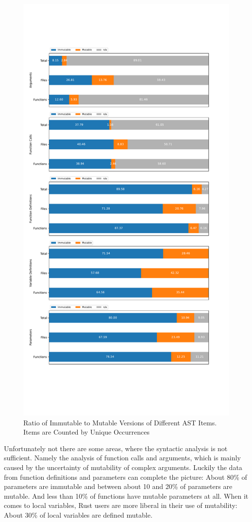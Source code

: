 \documentclass{book}
\theoremstyle{definition}
\begin{document}
\begin{figure}[h]
	\centering
	\includegraphics[width=0.9\linewidth, clip, trim={0.5cm 6cm 0.5cm 6cm}]{../mutability_by_category.pdf}
	\caption{Ratio of Immutable to Mutable Versions of Different AST Items. Items are Counted by Unique Occurrences}
	\label{fig:mutabillity_by_category}
\end{figure}

Unfortunately not there are some areas, where the syntactic analysis is not sufficient. Namely the analysis of function calls and arguments, which is mainly caused by the uncertainty of mutability of complex arguments.
Luckily the data from function definitions and parameters can complete the picture: About 80\% of parameters are immutable and between about 10 and 20\% of parameters are mutable. And less than 10\% of functions have mutable parameters at all.
When it comes to local variables, Rust users are more liberal in their use of mutability:
About 30\% of local variables are defined mutable.
\end{document}
